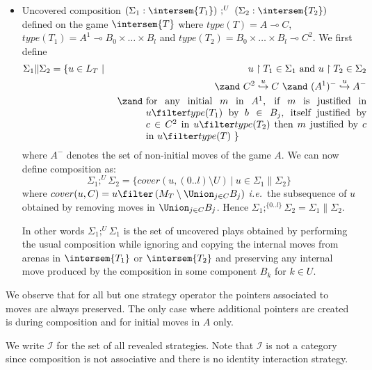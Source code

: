 \begin{definition}
\begin{itemize}[-]
\item Uncovered composition $(\Sigma_1 : \intersem{T_1})\ ;^U\ (\Sigma_2
:\intersem{T_2})$ defined on the game $\intersem{T}$ where
$type(T) = A \multimap C$, $type(T_1) = A^1 \multimap B_0 \times
\ldots \times B_l$ and $type(T_2) = B_0 \times \ldots \times B_l
\multimap C^2$. We first define
\begin{eqnarray*}
\Sigma_1 \| \Sigma_2 &= \{ u \in L_T  \ | \ & u \upharpoonright T_1 \in \Sigma_1 \mbox{ and } u \upharpoonright T_2 \in \Sigma_2 \\
&& \zand\ C^2\stackrel{u}\hookrightarrow C\ \zand\ (A^1)^-\stackrel{u}\hookrightarrow A^-  \\
&& \zand\ \parbox[t]{8cm}{for any initial $m$ in $A^1$, if $m$ is justified in $u \filter type(T_1)$ by $b\in B_j$,
itself justified by $c \in C^2$ in $u \filter type(T_2)$ then $m$ justified by $c$ in $u \filter type(T)$ \} }
\end{eqnarray*}
where $A^-$ denotes the set of non-initial moves of the game $A$. We can now define composition as:
$$ \Sigma_1 ;^U \Sigma_2 = \{ cover(u,(0..l)\setminus U) \ | \ u \in \Sigma_1 \| \Sigma_2 \}$$
where $cover(u,C) = u \filter \left( M_T \setminus \Union_{j\in
C} B_j \right)$ {\it i.e.}~the subsequence of $u$ obtained by
removing moves in $\Union_{j\in C} B_j$. Hence
$\Sigma_1;^{\{0..l\}} \Sigma_2 = \Sigma_1 \| \Sigma_2$.

In other words $\Sigma_1 ;^U \Sigma_1$ is the set of uncovered
plays obtained by performing the usual composition while
ignoring and copying the internal moves from arenas in
$\intersem{T_1}$ or $\intersem{T_2}$ and preserving any internal
move produced by the composition in some component $B_k$ for $k
\in U$.
\end{itemize}
\end{definition}

\begin{remark}
\label{rem:interstrat}
We observe that for all but one strategy operator the pointers associated to moves are always preserved. The only case where additional pointers
are created is during composition and for initial moves in $A$ only.
\end{remark}

We write $\mathcal{I}$ for the set of all revealed strategies. Note
that $\mathcal{I}$ is not a category since composition is not
associative and there is no identity interaction strategy.


